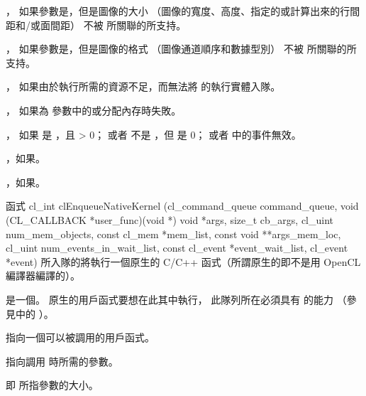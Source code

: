 \item {}，
如果參數是，但是圖像的大小
（圖像的寬度、高度、指定的或計算出來的行間距和/或面間距）
不被  所關聯的所支持。

\item {}，
如果參數是，但是圖像的格式
（圖像通道順序和數據型別）
不被  所關聯的所支持。

\item {}，
如果由於執行所需的資源不足，而無法將  的執行實體入隊。

\item {}，
如果為  參數中的或分配內存時失敗。

\item {}，
  如果  是 ，且  > 0；
  或者  不是 ，但  是 0；
  或者  中的事件無效。

\item {}，如果\scdevfailres。

\item {}，如果\schostfailres。
\stopigBase

函式
\startCLFUNC
cl_int clEnqueueNativeKernel (cl_command_queue command_queue,
			void (CL_CALLBACK *user_func)(void *)
			void *args,
			size_t cb_args,
			cl_uint num_mem_objects,
			const cl_mem *mem_list,
			const void **args_mem_loc,
			cl_uint num_events_in_wait_list,
			const cl_event *event_wait_list,
			cl_event *event)
\stopCLFUNC
所入隊的將執行一個原生的 C/C++ 函式（所謂原生的即不是用 OpenCL 編譯器編譯的）。

 是一個。
原生的用戶函式要想在此其中執行，
此隊列所在必須具有  的能力
（參見中的 ）。

 指向一個可以被調用的用戶函式。

 指向調用  時所需的參數。

 即  所指參數的大小。

